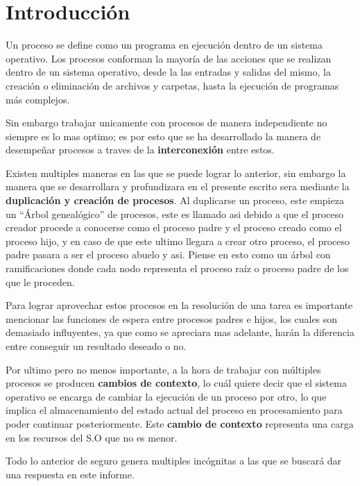 \section{Introducción}
Un proceso se define como un programa en ejecución dentro de un sistema operativo. Los procesos conforman la mayoría de las acciones que se realizan dentro de un sistema operativo, desde la las entradas y salidas del mismo, la creación o eliminación de archivos y carpetas, hasta la ejecución de programas más complejos.

Sin embargo trabajar unicamente con procesos de manera independiente no siempre es lo mas optimo; es por esto que se ha desarrollado la manera de desempeñar procesos a traves de la \textbf{interconexión} entre estos.

Existen multiples maneras en las que se puede lograr lo anterior, sin embargo la manera que se desarrollara y profundizara en el presente escrito sera mediante la \textbf{duplicación y creación de procesos}. Al duplicarse un proceso, este empieza un ``Árbol genealógico'' de procesos, este es llamado asi debido a que el proceso creador procede a conocerse como el proceso padre y el proceso creado como el proceso hijo, y en caso de que este ultimo llegara a crear otro proceso, el proceso padre pasara a ser el proceso abuelo y asi. Piense en esto como un árbol con ramificaciones donde cada nodo representa el proceso raíz o proceso padre de los que le proceden.

Para lograr aprovechar estos procesos en la resolución de una tarea es importante mencionar las funciones de espera entre procesos padres e hijos, los cuales son demasiado influyentes, ya que como se apreciara mas adelante, harán la diferencia entre conseguir un resultado deseado o no.

Por ultimo pero no menos importante, a la hora de trabajar con múltiples procesos se producen \textbf{cambios de contexto}, lo cuál quiere decir que el sistema operativo se encarga de cambiar la ejecución de un proceso por otro, lo que implica el almacenamiento del estado actual del proceso en procesamiento para poder continuar posteriormente. Este \textbf{cambio de contexto} representa una carga en los recursos del S.O que no es menor.

Todo lo anterior de seguro genera multiples incógnitas a las que se buscará dar una respuesta en este informe.